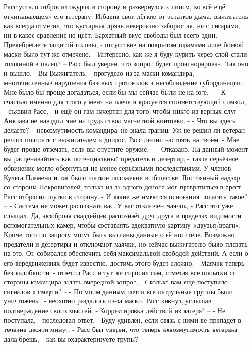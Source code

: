 \documentclass[a4paper, 12pt]{report}
\begin{document}
	Расс устало отбросил окурок в сторону и развернулся к лицом, ко всё ещё отчитывающему  его ветерану. Избавив свои лёгкие от остатков дыма, выжигатель как всегда отметил, что кустарная дрянь невероятно забористая, но с сигарами, ни в какое сравнение не идёт. Бархатный вкус свободы был всего один.
	- Пренебрегаете защитой головы, - отсутствие на покрытом шрамами лице боевой маски было тут же отмечено.
	- Интересно, как же я буду курить через слой стали толщиной в палец? – Расс был уверен, что вопрос будет проигнорирован. Так оно и вышло.
	- Вы Выжигатель, - прогудело из-за маски командира, - многочисленные нарушения базовых протоколов и несоблюдение субординации. Мне было бы проще догадаться, если бы мы сейчас были не на юге. –
	- К счастью именно для этого у меня на плече и красуется соответствующий символ, - съязвил Расс, - и ещё он там начертан для того, чтобы никто из верных слуг Анклава не наводил мне на грудь ствол магнитной винтовки. -
	- Что вы здесь делаете? – невозмутимость командира, не знала границ. Уж не решил ли ветеран решил поиграть с выжигателем в допрос. Расс решил настоять на своём.
	- Мне будет проще отвечать, если вы опустите оружие. –
	- Отказано. На данный момент вы расценивайтесь как потенциальный предатель и дезертир, - такое серьёзное обвинение могло обернуться не менее серьёзными последствиями. У членов Культа Пламени и так было шаткое положение в обществе. Постоянный надзор со стороны Покровителей, только из-за одного доноса мог превратиться в арест.
	Расс отбросил шутки в сторону.
	- И какие же имеются основания полагать такое? –
	- Система не может распознать вас. У вас отключен маячок, - Расс это уже слышал. Да, экзоброня гвардейцев распознаёт друг друга в пределах видимости вспомогательных камер, чтобы составлять адекватную картину «друзья/враги». Кроме того по запросу могут быть высланы данные о её носителе. Возможно, предатели и дезертиры и отключают маячки, но сейчас выжигателю было плевать на это. Он собирался обеспечить себя максимальной свободой действий. А если о его передвижениях будет известно, достичь этого будет сложно.
	- Маячок теперь без надобности, - ответил Расс и тут же спросил сам, отметая все попытки со стороны командира задать очередной вопрос, - Сколько вам ещё поступило сигналов о смерти? –
	- По моим данным почти все патрульные группы были уничтожены, - неохотно раздалось из-за маски. Расс кивнул, услышав подтверждение своих мыслей.
	- Корректировка действий из лагеря? –
	- Не поступала, - последовал ответ.
	- Буду удивлён, если связь с ними не пропадёт в течение десяти минут. - Расс был уверен, что теперь невозмутимость ветерана дала брешь, - как вы охарактеризуете трупы? –
\end{document}
